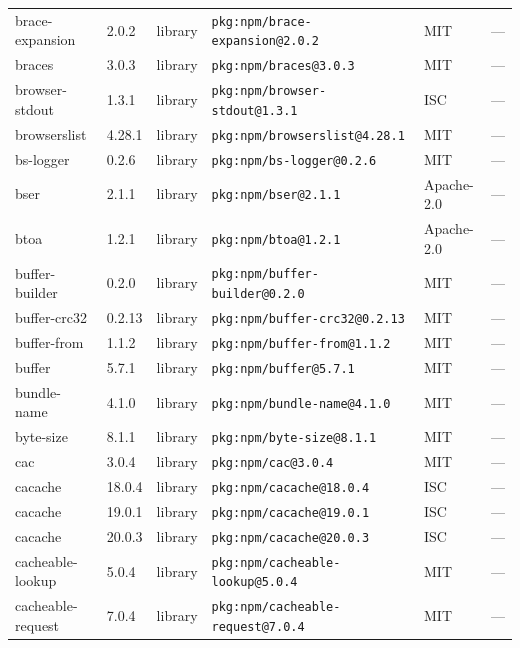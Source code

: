 \documentclass[11pt,a4paper]{article}
\begin{document}
\begin{longtable}{|p{4cm}|p{2cm}|p{1.6cm}|p{5cm}|p{1.5cm}|p{3.5cm}|}
\raggedright brace-expansion & 2.0.2 & library & \small\texttt{pkg:npm/brace-expansion@2.0.2} & MIT & \small — \\
\raggedright braces & 3.0.3 & library & \small\texttt{pkg:npm/braces@3.0.3} & MIT & \small — \\
\raggedright browser-stdout & 1.3.1 & library & \small\texttt{pkg:npm/browser-stdout@1.3.1} & ISC & \small — \\
\raggedright browserslist & 4.28.1 & library & \small\texttt{pkg:npm/browserslist@4.28.1} & MIT & \small — \\
\raggedright bs-logger & 0.2.6 & library & \small\texttt{pkg:npm/bs-logger@0.2.6} & MIT & \small — \\
\raggedright bser & 2.1.1 & library & \small\texttt{pkg:npm/bser@2.1.1} & Apache-2.0 & \small — \\
\raggedright btoa & 1.2.1 & library & \small\texttt{pkg:npm/btoa@1.2.1} & Apache-2.0 & \small — \\
\raggedright buffer-builder & 0.2.0 & library & \small\texttt{pkg:npm/buffer-builder@0.2.0} & MIT & \small — \\
\raggedright buffer-crc32 & 0.2.13 & library & \small\texttt{pkg:npm/buffer-crc32@0.2.13} & MIT & \small — \\
\raggedright buffer-from & 1.1.2 & library & \small\texttt{pkg:npm/buffer-from@1.1.2} & MIT & \small — \\
\raggedright buffer & 5.7.1 & library & \small\texttt{pkg:npm/buffer@5.7.1} & MIT & \small — \\
\raggedright bundle-name & 4.1.0 & library & \small\texttt{pkg:npm/bundle-name@4.1.0} & MIT & \small — \\
\raggedright byte-size & 8.1.1 & library & \small\texttt{pkg:npm/byte-size@8.1.1} & MIT & \small — \\
\raggedright cac & 3.0.4 & library & \small\texttt{pkg:npm/cac@3.0.4} & MIT & \small — \\
\raggedright cacache & 18.0.4 & library & \small\texttt{pkg:npm/cacache@18.0.4} & ISC & \small — \\
\raggedright cacache & 19.0.1 & library & \small\texttt{pkg:npm/cacache@19.0.1} & ISC & \small — \\
\raggedright cacache & 20.0.3 & library & \small\texttt{pkg:npm/cacache@20.0.3} & ISC & \small — \\
\raggedright cacheable-lookup & 5.0.4 & library & \small\texttt{pkg:npm/cacheable-lookup@5.0.4} & MIT & \small — \\
\raggedright cacheable-request & 7.0.4 & library & \small\texttt{pkg:npm/cacheable-request@7.0.4} & MIT & \small — \\

\end{longtable}
\end{document}
